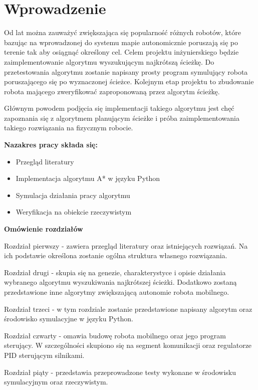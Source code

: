 \section{Wprowadzenie}
Od lat można zauważyć zwiększająca się popularność różnych robotów, które bazując na wprowadzonej do systemu mapie
autonomicznie poruszają się po terenie tak aby osiągnąć określony cel.
Celem projektu inżynierskiego będzie zaimplementowanie algorytmu wyszukującym najkrótszą ścieżkę.
Do przetestowania algorytmu zostanie napisany prosty program symulujący robota poruszającego się po wyznaczonej ścieżce.
Kolejnym etap projektu to zbudowanie robota mającego zweryfikować zaproponowaną przez algorytm ścieżkę. 

Głównym powodem podjęcia się implementacji takiego algorytmu jest chęć zapoznania się z algorytmem planującym ścieżke 
i próba zaimplementowania takiego rozwiązania na fizycznym robocie.


\textbf{Nazakres pracy składa się:}
\begin{itemize}
	\item Przegląd literatury
	\item Implementacja algorytmu A* w języku Python
	\item Symulacja działania pracy algorytmu
	\item Weryfikacja na obiekcie rzeczywistym
\end{itemize}

\textbf{Omówienie rozdziałów}

Rozdział pierwszy - zawiera przegląd literatury oraz istniejących rozwiązań. 
Na ich podstawie określona zostanie ogólna struktura własnego rozwiązania.

Rozdział drugi - skupia się na genezie, charakterystyce i opisie działania wybranego algorytmu wyszukiwania najkrótszej ścieżki.
Dodatkowo zostaną przedstawione inne algorytmy zwiększającą autonomie robota mobilnego.

Rozdział trzeci - w tym rozdziale zostanie przedstawione napisany algorytm oraz środowisko symulacyjne w języku Python.

Rozdział czwarty - omawia budowę robota mobilnego oraz jego program sterujący.
W szczególności skupiono się na segment komunikacji oraz regulatorze PID sterującym silnikami.

Rozdział piąty - przedstawia przeprowadzone testy wykonane w środowisku symulacyjnym oraz rzeczywistym. 